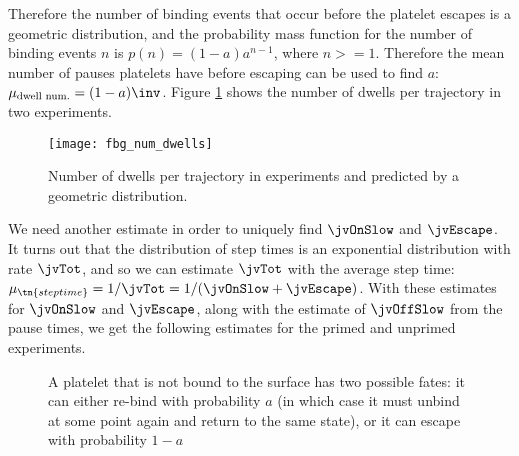 Therefore the number of binding events that occur before the platelet
escapes is a geometric distribution, and the probability mass function
for the number of binding events $n$ is $p(n) = (1 - a) a^{n - 1}$,
where $n >= 1$. Therefore the mean number of pauses platelets have
before escaping can be used to find $a$: $\mu_\textnormal{dwell num.}
= (1 - a)\inv$. Figure \ref{fig:ndwells} shows the number of dwells per
trajectory in two experiments.

\begin{figure}
  \centering
  \texttt{[image: fbg\_num\_dwells]}
  \caption{Number of dwells per trajectory in experiments and
    predicted by a geometric distribution.}
  \label{fig:ndwells}
\end{figure}

We need another estimate in order to uniquely find $\jvOnSlow$ and
$\jvEscape$.  It turns out that the distribution of step times is an
exponential distribution with rate $\jvTot$, and so we can estimate
$\jvTot$ with the average step time: $\mu_\tn{step time} = 1/\jvTot =
1/(\jvOnSlow + \jvEscape)$. With these estimates for $\jvOnSlow$ and
$\jvEscape$, along with the estimate of $\jvOffSlow$ from the pause
times, we get the following estimates for the primed and unprimed
experiments. 

\begin{figure}
  \centering
  \caption[Possible fates of an unbound platelet]{A platelet that is
    not bound to the surface has two possible fates: it can either
    re-bind with probability $a$ (in which case it must unbind at some
    point again and return to the same state), or it can escape with
    probability $1 - a$}
  \label{fig:unbd-plt-fates}
\end{figure}


